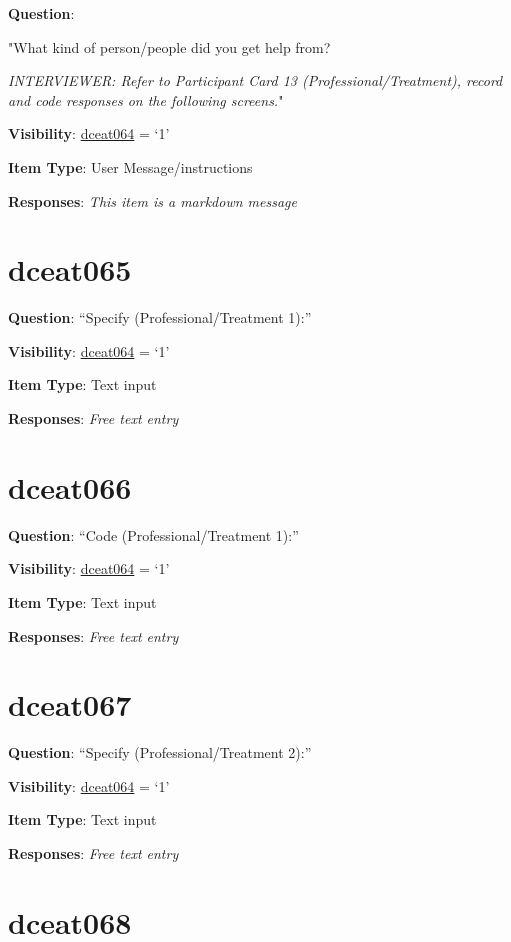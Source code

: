 \documentclass[]{book}
\begin{document}
\textbf{Question}:

"What kind of person/people did you get help from?

\emph{INTERVIEWER: Refer to Participant Card 13 (Professional/Treatment), record and code responses on the following screens.}"

\textbf{Visibility}: \protect\hyperlink{dceat064}{dceat064} = `1'

\textbf{Item Type}: User Message/instructions

\textbf{Responses}: \emph{This item is a markdown message}

\hypertarget{dceat065}{%
\section{dceat065}\label{dceat065}}

\textbf{Question}: ``Specify (Professional/Treatment 1):''

\textbf{Visibility}: \protect\hyperlink{dceat064}{dceat064} = `1'

\textbf{Item Type}: Text input

\textbf{Responses}: \emph{Free text entry}

\hypertarget{dceat066}{%
\section{dceat066}\label{dceat066}}

\textbf{Question}: ``Code (Professional/Treatment 1):''

\textbf{Visibility}: \protect\hyperlink{dceat064}{dceat064} = `1'

\textbf{Item Type}: Text input

\textbf{Responses}: \emph{Free text entry}

\hypertarget{dceat067}{%
\section{dceat067}\label{dceat067}}

\textbf{Question}: ``Specify (Professional/Treatment 2):''

\textbf{Visibility}: \protect\hyperlink{dceat064}{dceat064} = `1'

\textbf{Item Type}: Text input

\textbf{Responses}: \emph{Free text entry}

\hypertarget{dceat068}{%
\section{dceat068}\label{dceat068}}
\end{document}
